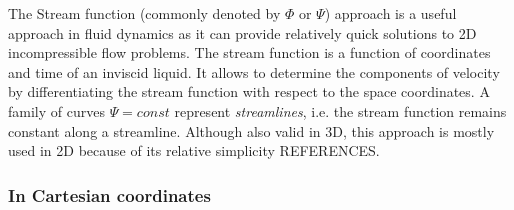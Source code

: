 
\Literature \cite{giju98}\cite{scja81}\cite{chyu84}\cite{chri84}\cite{hayu94}\cite{olwh97}




The Stream function (commonly denoted by $\Phi$ or $\Psi$) approach is a useful approach in fluid dynamics as it 
can provide relatively quick solutions to 2D incompressible flow problems.
The stream function is a function of coordinates and time of an inviscid liquid.
It allows to determine the components of velocity by differentiating the stream function 
with respect to the space coordinates. 
A family of curves $\Psi = const$ represent {\it streamlines}, i.e. 
the stream function remains constant along a streamline. 
Although also valid in 3D, this approach is mostly used in 2D because of its 
relative simplicity {\color{red} REFERENCES}.

\subsubsection{In Cartesian coordinates}

